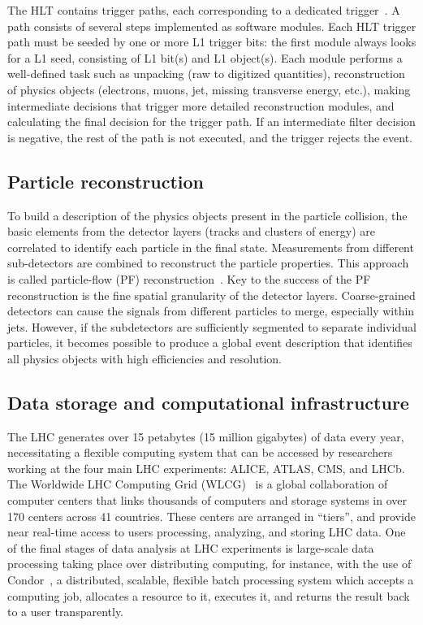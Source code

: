 The HLT contains trigger paths, each corresponding to a dedicated trigger~\cite{twiki_SoftwareGuide_HLT}.  A path consists of several steps implemented as software modules. Each HLT trigger path must be seeded by one or more L1 trigger bits: the first module always looks for a L1 seed, consisting of L1 bit(s) and L1 object(s). Each module performs a well-defined task such as unpacking (raw to digitized quantities), reconstruction of physics objects (electrons, muons, jet, missing transverse energy, etc.), making intermediate decisions that trigger more detailed reconstruction modules, and calculating the final decision for the trigger path. If an intermediate filter decision is negative, the rest of the path is not executed, and the trigger rejects the event.


\subsection{Particle reconstruction}
To build a description of the physics objects present in the particle collision, the basic elements from the detector layers (tracks and clusters of energy) are correlated to identify each particle in the final state. Measurements from different sub-detectors are combined to reconstruct the particle properties. This approach is called particle-flow (PF) reconstruction~\cite{CERN-EP-2017-110}. Key to the success of the PF reconstruction is the fine spatial granularity of the detector layers. Coarse-grained detectors can cause the signals from different particles to merge, especially within jets. However, if the subdetectors are sufficiently segmented to separate individual particles, it becomes possible to produce a global event description that identifies all physics objects with high efficiencies and resolution.

\subsection{Data storage and computational infrastructure}

The LHC generates over 15 petabytes (15 million gigabytes) of data every year, necessitating a flexible computing system that can be accessed by researchers working at the four main LHC experiments: ALICE, ATLAS, CMS, and LHCb. The Worldwide LHC Computing Grid (WLCG)~\cite{computing-Worldwide:1997398} is a global collaboration of computer centers that links thousands of computers and storage systems in over 170 centers across 41 countries. These centers are arranged in ``tiers'', and provide near real-time access to users processing, analyzing, and storing LHC data. One of the final stages of data analysis at LHC experiments is large-scale data processing taking place over distributing computing, for instance, with the use of Condor~\cite{condor-article}, a distributed, scalable, flexible batch processing system which accepts a computing job, allocates a resource to it, executes it, and returns the result back to a user transparently. 
 
